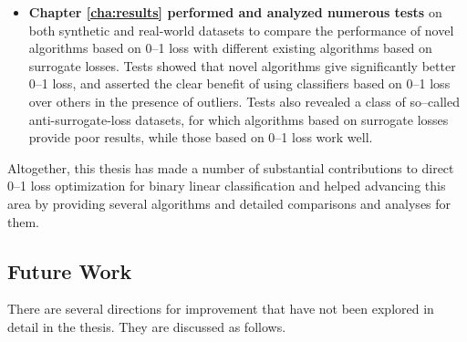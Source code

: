 \begin{itemize}
\item {\bf Chapter \ref{cha:results} performed and analyzed numerous tests} on both synthetic and real-world datasets to compare the performance of novel algorithms based on 0--1 loss with different existing algorithms based on surrogate losses. Tests showed that novel algorithms give significantly better 0--1 loss, and asserted the clear benefit of using classifiers based on 0--1 loss over others in the presence of outliers. Tests also revealed a class of so--called anti-surrogate-loss datasets, for which algorithms based on surrogate losses provide poor results, while those based on 0--1 loss work well.

\end{itemize}

Altogether, this thesis has made a number of substantial contributions to direct 0--1 loss optimization for binary linear classification and helped advancing this area by providing several algorithms and detailed comparisons and analyses for them.

\subsection{Future Work}
\label{sec:concl.futurework}

There are several directions for improvement that have not been explored in detail in the thesis. They are discussed as follows. 

